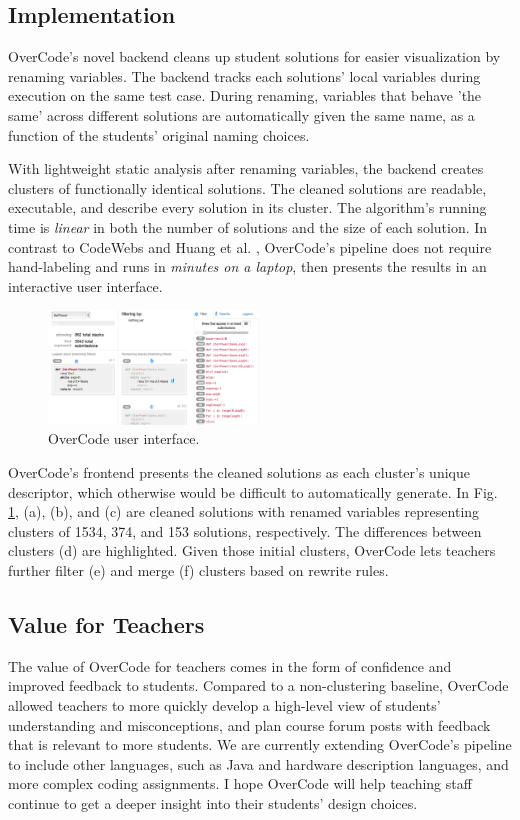 \documentclass{sigchi}
\begin{document}
\subsection{Implementation}
OverCode's novel backend cleans up student solutions for easier visualization by renaming variables. The backend tracks each solutions' local variables during execution on the same test case. During renaming, variables that behave 'the same' across different solutions are automatically given the same name, as a function of the students' original naming choices. 

With lightweight static analysis after renaming variables, the backend creates clusters of functionally identical solutions. The cleaned solutions are readable, executable, and describe every solution in its cluster. The algorithm's running time is \emph{linear} in both the number of solutions and the size of each solution. In contrast to CodeWebs \cite{codewebs} and Huang et al. \citeyear{MOOCshop}, OverCode's pipeline does not require hand-labeling and runs in \emph{minutes on a laptop}, then presents the results in an interactive user interface.

\begin{figure}[h!]
\centering
\includegraphics[width=0.5\textwidth]{frontPageInterfacePreviewLabeled.jpg}
\caption{OverCode user interface.}
\label{fig:figure1}
\end{figure}

OverCode's frontend presents the cleaned solutions as each cluster's unique descriptor, which otherwise would be difficult to automatically generate. In Fig. \ref{fig:figure1}, (a), (b), and (c) are cleaned solutions with renamed variables representing clusters of 1534, 374, and 153 solutions, respectively. The differences between clusters (d) are highlighted. Given those initial clusters, OverCode lets teachers further filter (e) and merge (f) clusters based on rewrite rules.

\subsection{Value for Teachers}
The value of OverCode for teachers comes in the form of confidence and improved feedback to students. Compared to a non-clustering baseline, OverCode allowed teachers to more quickly develop a high-level view of students' understanding and misconceptions, and plan course forum posts with feedback that is relevant to more students. We are currently extending OverCode's pipeline to include other languages, such as Java and hardware description languages, and more complex coding assignments. I hope OverCode will help teaching staff continue to get a deeper insight into their students' design choices.
\end{document}

